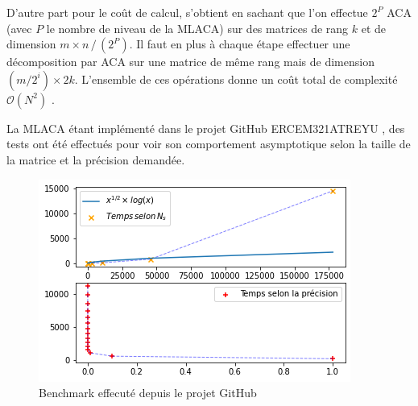 \documentclass[10pt]{SelfArx} %
\begin{document}
D'autre part pour le coût de calcul, s'obtient en sachant que l'on effectue $2^P$ ACA (avec $P$ le nombre de niveau de la MLACA) sur des matrices de rang $k$ et de dimension $m \times n \, / \, (2^P)$. Il faut en plus à chaque étape effectuer une décomposition par ACA sur une matrice de même rang mais de dimension $(m / 2^i) \times 2k$. L'ensemble de ces opérations donne un coût total de complexité $\mathcal{O}(N^2)$ \cite{tamayo_multilevel_2011}.

La MLACA étant implémenté dans le projet GitHub ERCEM321\textunderscore ATREYU \cite{git_proj}, des tests ont été effectués pour voir son comportement asymptotique selon la taille de la matrice et la précision demandée. 

\begin{figure}[ht]\centering
	\includegraphics[width=\linewidth]{Atreyu_test.png}
	\captionsetup{justification=centering}
	\caption{Benchmark effecuté depuis le projet GitHub \cite{git_proj}}
	\label{fig:atreyu_test}
\end{figure}
\end{document}
